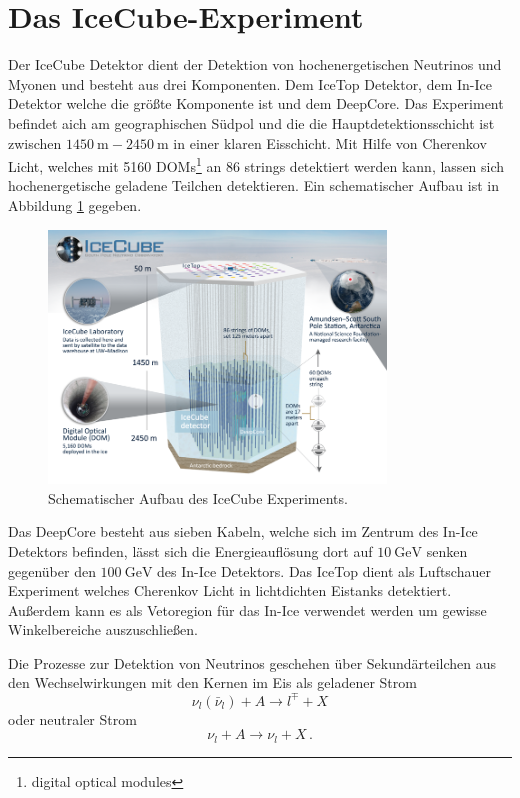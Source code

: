 \section{Das IceCube-Experiment}
\label{sec:detector}
Der IceCube Detektor dient der Detektion von hochenergetischen  Neutrinos und Myonen und besteht aus drei Komponenten. Dem IceTop Detektor, dem In-Ice Detektor welche die gr\"o\ss te Komponente ist und dem DeepCore.
Das Experiment befindet aich am geographischen S\"udpol und die die Hauptdetektionsschicht ist zwischen $\SI{1450}{\meter} - \SI{2450}{\meter}$ in einer klaren Eisschicht.
Mit Hilfe von Cherenkov Licht, welches mit 5160 DOMs\footnote{digital optical modules} an 86 strings detektiert werden kann, lassen sich hochenergetische geladene Teilchen detektieren.
Ein schematischer Aufbau ist in Abbildung \ref{fig:cube} gegeben.

\begin{figure}
  \centering
  \includegraphics[width=0.8\textwidth]{plots/icecube_detector_sm.png}
  \caption{Schematischer Aufbau des IceCube Experiments.}
  \label{fig:cube}
\end{figure}

Das DeepCore besteht aus sieben Kabeln, welche sich im Zentrum des In-Ice Detektors befinden, l\"asst sich die Energieaufl\"osung dort auf $\SI{10}{\giga\electronvolt}$ senken gegen\"uber den $\SI{100}{\giga\electronvolt}$ des In-Ice Detektors.
Das IceTop dient als Luftschauer Experiment welches Cherenkov Licht in lichtdichten Eistanks detektiert. Au\ss erdem kann es als Vetoregion f\"ur das In-Ice verwendet werden um gewisse Winkelbereiche auszuschlie\ss en.

Die Prozesse zur Detektion von Neutrinos geschehen \"uber Sekund\"arteilchen aus den Wechselwirkungen mit den Kernen im Eis als geladener Strom
\begin{equation*}
  \nu_l (\bar{\nu}_l) + A \to l^{\mp} + X
\end{equation*}
oder neutraler Strom
\begin{equation*}
  \nu_l + A \to \nu_l + X\,.
\end{equation*}

